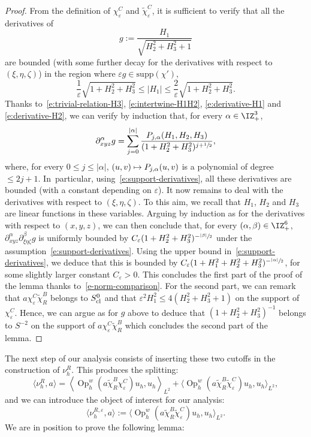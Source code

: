 \documentclass[JEP,XML,SOM,Unicode, NoEqCountersInSection,published]{cedram}
\newcommand\mto{\mathchoice{\longmapsto}{\mapsto}{\mapsto}{\mapsto}}
\theoremstyle{plain}
\theoremstyle{definition}
\theoremstyle{remark}
\newcommand{\Op}{\operatorname{Op}}
\begin{document}
\begin{proof}
From the definition of $\chi_\varepsilon^C$ and $\tilde{\chi}_\varepsilon^C$, it is sufficient to verify that all the derivatives of
\[
g:=\frac{H_1}{\sqrt{H_2^2+H_3^2+1}}
\]
are bounded (with some further decay for the derivatives with respect to $(\xi,\eta,\zeta)$) in the region where $\varepsilon g\in\text{supp}(\chi')$, \ie
\begin{equation}\label{e:support-derivatives}
\frac{1}{\varepsilon}\sqrt{1+H_2^2+H_3^2}\leq |H_1|\leq \frac{2}{\varepsilon}\sqrt{1+H_2^2+H_3^2}.
\end{equation}
Thanks to~\eqref{e:trivial-relation-H3}, \eqref{e:intertwine-H1H2}, \eqref{e:derivative-H1} and \eqref{e:derivative-H2}, we can verify by induction that, for every $\alpha\in\IZ_+^3$,
\[
\partial_{xyz}^{\alpha}g=\sum_{j=0}^{|\alpha|}\frac{P_{j,\alpha}(H_1,H_2, H_3)}{(1+H_2^2+H_3^2)^{j+\sfrac{1}{2}}},
\]
where, for every $0\leq j\leq |\alpha|$, $(u,v)\mto P_{j,\alpha}(u,v)$ is a polynomial of degree $\leq 2j+1$. In~particular, using~\eqref{e:support-derivatives}, all these derivatives are bounded (with a constant depending on $\varepsilon$). It now remains to deal with the derivatives with respect to $(\xi,\eta,\zeta)$. To this aim, we recall that $H_1$, $H_2$ and $H_3$ are linear functions in these variables. Arguing by induction as for the derivatives with respect to $(x,y,z)$, we can then conclude that, for every $(\alpha,\beta)\in \IZ_+^6$, $\partial_{xyz}^\alpha\partial_{\xi\eta\zeta}^\beta g$ is uniformly bounded by $C_\varepsilon (1+H_2^2+H_3^2)^{-\sfrac{|\beta|}{2}}$ under the assumption~\eqref{e:support-derivatives}. Using the upper bound in~\eqref{e:support-derivatives}, we deduce that this is bounded by $C_\varepsilon(1+H_1^2+H_2^2+H_3^2)^{-\sfrac{|\alpha|}{2}}$, for some slightly larger constant $C_\varepsilon>0$. This concludes the first part of the proof of the lemma thanks to~\eqref{e-norm-comparison}. For the second part, we can remark that $a\chi_\varepsilon^C\tilde{\chi}_R^B$ belongs to $S^0_{\textup{cl}}$ and that $ \varepsilon^2H_1^2\leq 4(H_2^2+H_3^2+1)$ on the support of $\chi_\varepsilon^C$. Hence, we can argue as for $g$ above to deduce that $(1+H_2^2+H_3^2)^{-1}$ belongs to $S^{-2}$ on the support of $a\chi_\varepsilon^C\tilde{\chi}_R^B$ which concludes the second part of the lemma.
\end{proof}

The next step of our analysis consists of inserting these two cutoffs in the construction of $\nu_h^R$. This produces the splitting:
\[
\langle\nu_h^R,a\rangle=\left\langle \Op_h^w(a\tilde{\chi}_R^B\chi_\varepsilon^C)u_h,u_h\right\rangle_{L^2}
+\bigl\langle \Op_h^w(a\tilde{\chi}_R^B\tilde{\chi}_\varepsilon^C)u_h,u_h\bigr\rangle_{L^2},
\]
and we can introduce the object of interest for our analysis:
\begin{equation}\label{e:measure-cone-infinity}
\langle\nu_h^{R,\varepsilon},a\rangle:=\bigl\langle \Op_h^w(a\tilde{\chi}_R^B\tilde{\chi}_\varepsilon^C)u_h,u_h\bigr\rangle_{L^2}.
\end{equation}
We are in position to prove the following lemma:
\end{document}

